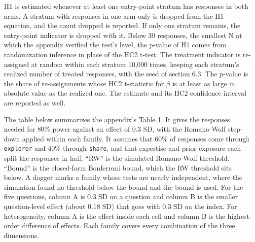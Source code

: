 H1 is estimated whenever at least one entry-point stratum has responses in both arms. A stratum
with responses in one arm only is dropped from the H1 equation, and the count dropped is
reported. If only one stratum remains, the entry-point indicator is dropped with it. Below 30
responses, the smallest N at which the appendix verified the test's level, the p-value of H1
comes from randomization inference in place of the HC2 t-test. The treatment indicator is
re-assigned at random within each stratum 10,000 times, keeping each stratum's realized number
of treated responses, with the seed of section 6.3. The p-value is the share of re-assignments
whose HC2 t-statistic for \(\beta\) is at least as large in absolute value as the realized one.
The estimate and its HC2 confidence interval are reported as well.

The table below summarizes the appendix's Table 1. It gives the responses needed for 80\% power
against an effect of 0.3 SD, with the Romano-Wolf step-down applied within each family. It assumes
that 60\% of responses come through \texttt{explorer} and 40\% through \texttt{share}, and that expertise and prior
exposure each split the responses in half. ``RW'' is the simulated Romano-Wolf threshold. ``Bound'' is
the closed-form Bonferroni bound, which the RW threshold sits below. A dagger marks a family
whose tests are nearly independent, where the simulation found no threshold below the bound and
the bound is used. For the five questions, column A is 0.3 SD on a question and column B is the
smaller question-level effect (about 0.18 SD) that goes with 0.3 SD on the index. For
heterogeneity, column A is the effect inside each cell and column B is the highest-order
difference of effects. Each family covers every combination of the three dimensions.

